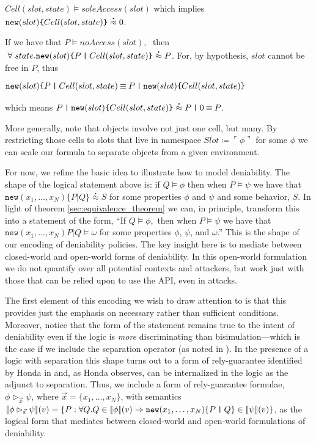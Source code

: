 \documentclass[]{amsart}
\newcommand{\ldb}{[\![}
\newcommand{\rdb}{]\!]}
\newcommand{\lpquote}{\ulcorner}
\newcommand{\rpquote}{\urcorner}
\newcommand{\id}[1]{\texttt{#1}}
\newcommand{\juxtap}{\mathbin{\id{|}}}
\newcommand{\scong}{\mathbin{\equiv}}
\newcommand{\binpar}[2]{#1 \juxtap #2}
\newcommand{\pmeaningof}[1]{\ldb #1 \rdb}
\newcommand{\defneqls}{\coloneqq}
\newcommand{\wbbisim}{\stackrel{\centerdot}{\approx}} %
\newcommand{\pquotep}[1]{\lpquote #1 \rpquote}
\theoremstyle{definition}
\theoremstyle{remark}
\numberwithin{equation}{subsection}
\begin{document}
$Cell (slot, state) \models soleAccess( slot )$ which implies
${\mbox{\tt new}(slot)\mbox{\tt \{} Cell(slot, state) \mbox{\tt \}}}
\wbbisim 0$.

If we have that $P \models noAccess( slot ), \;$ then $\; \forall \;
state . \mbox{\tt new}(slot)\mbox{\tt \{} \binpar{P}{Cell(slot,
  state)} \mbox{\tt \}}\wbbisim P$. For, by hypothesis, $slot$ cannot
be free in $P$, thus

$\mbox{\tt new}(slot)\mbox{\tt \{} \binpar{P}{Cell(slot, state)} \scong \binpar{P}{\mbox{\tt new}(slot)\mbox{\tt \{} Cell(slot, state) \mbox{\tt \}}}$

\noindent which means $\binpar{P}{\mbox{\tt new}(slot)\mbox{\tt \{} Cell(slot, state) \mbox{\tt \}}} \wbbisim \binpar{P}{0} \scong P$.

More generally, note that objects involve not just one cell, but
many. By restricting those cells to slots that live in namespace $Slot
\defneqls \pquotep{\phi}$ for some $\phi$ we can scale our formula to
separate objects from a given environment. 

For now, we refine the basic idea to illustrate how to model
deniability. The shape of the logical statement above is: if $Q
\models \phi$ then when $P \models \psi$ we have that
$\texttt{new}(x_1,\ldots,x_N)\{ \binpar{P}{Q} \} \wbbisim S$ for some
properties $\phi$ and $\psi$ and some behavior, $S$. In light of
theorem \ref{sec:equivalence_theorem} we can, in principle, transform
this into a statement of the form, ``If $Q \models \phi,$ then when $P
\models \psi$ we have that $\texttt{new}(x_1,\ldots,x_N)\binpar{P}{Q}
\models \omega$ for some properties $\phi$, $\psi$, and $\omega$.'' This
is the shape of our encoding of deniability policies. The key insight
here is to mediate between closed-world and open-world forms of
deniability. In this open-world formulation we do not quantify over
all potential contexts and attackers, but work just with those that
can be relied upon to use the API, even in attacks.

The first element of this encoding we wish to draw attention to is
that this provides just the emphasis on necessary rather than
sufficient conditions. Moreover, notice that the form of the statement
remains true to the intent of deniability even if the logic is
\emph{more} discriminating than bisimulation---which is the case if
we include the separation operator (as noted in
\cite{DBLP:conf/fossacs/Caires04}). In the presence of a logic with
separation this shape turns out to a form of rely-guarantee identified
by Honda in \cite{Honda:2008:UTP:2227536.2227558} and, as Honda
observes, can be internalized in the logic as the adjunct to
separation. Thus, we include a form of rely-guarantee formulae, $\phi
\rhd_{\vec{x}} \psi$, where $\vec{x} = \{ x_1,\ldots,x_N\}$, with
semantics $\pmeaningof{\phi \rhd_{\vec{x}} \psi}( v ) = \{ P : \forall
Q. Q \in \pmeaningof{\phi}( v ) \Rightarrow
\mbox{\texttt{new}}(x_1,\ldots,x_N)\mbox{\{}\binpar{P}{Q}\mbox{\}}\in
\pmeaningof{\psi}(v) \}$, as the logical form that mediates between
closed-world and open-world formulations of deniability.
\end{document}
